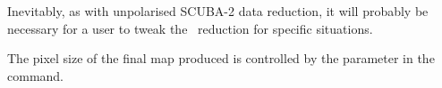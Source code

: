 Inevitably, as with unpolarised SCUBA-2 data reduction, it will
probably be necessary for a user to tweak the \poltwomap\ reduction for
specific situations.

The pixel size of the final map produced is controlled by the 
parameter in the \SMURF\  command.

\begin{terminalv}
\end{terminalv}








